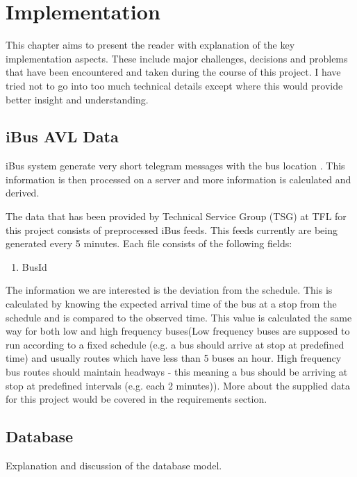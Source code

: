 \chapter{Implementation}
This chapter aims to present the reader with explanation of the key implementation aspects. These include major challenges, decisions and problems that have been encountered and taken during the course of this project. I have tried not to go into too much technical details except where this would provide better insight and understanding.

\section{iBus AVL Data}
iBus system generate very short telegram messages with the bus location \cite{Hounsell201276}. This information is then processed on a server and more information is calculated and derived.

The data that has been provided by Technical Service Group (TSG) at TFL for this project consists of preprocessed iBus feeds. This feeds currently are being generated every 5 minutes. Each file consists of the following fields:
\begin{enumerate}
\item BusId
\end{enumerate}

The information we are interested is the deviation from the schedule. This is calculated by knowing the expected arrival time of the bus at a stop from the schedule and is compared to the observed time. This value is calculated the same way for both low and high frequency buses(Low frequency buses are supposed to run according to a fixed schedule (e.g. a bus should arrive at stop at predefined time) and usually routes which have less than 5 buses an hour. High frequency bus routes should maintain headways - this meaning a bus should be arriving at stop at predefined intervals (e.g. each 2 minutes)). More about the supplied data for this project would be covered in the requirements section.

\section{Database}
Explanation and discussion of the database model.

